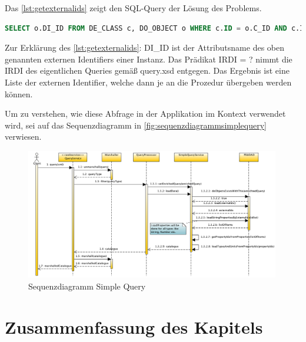 Das \autoref{lst:getexternalids} zeigt den SQL-Query der Lösung des Problems.

\begin{lstlisting}[caption=JAXB Maven Plugin, language=SQL, label=lst:getexternalids]
SELECT o.DI_ID FROM DE_CLASS c, DO_OBJECT o WHERE c.ID = o.C_ID AND c.IRDI = ?
\end{lstlisting}

Zur Erklärung des \autoref{lst:getexternalids}:
DI\_ID ist der Attributsname des oben genannten externen Identifiers einer Instanz. Das Prädikat IRDI = ? nimmt die IRDI des eigentlichen Queries gemäß query.xsd entgegen. Das Ergebnis ist eine Liste der externen Identifier, welche dann je an die Prozedur übergeben werden können. 

Um zu verstehen, wie diese Abfrage in der Applikation im Kontext verwendet wird, sei auf das Sequenzdiagramm in \autoref{fig:sequenzdiagrammsimplequery} verwiesen. 

\begin{figure}[htbp]
	\centering
		\includegraphics[width=0.99\textwidth]{images/plib_simple_query_sequence_diagram.png}
		\caption{Sequenzdiagramm Simple Query}
	\label{fig:sequenzdiagrammsimplequery}
\end{figure}

\section{Zusammenfassung des Kapitels}



